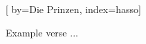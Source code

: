 
[%
    by={Die Prinzen},
    index={hasso}]


    \label{hasso}

    \beginverse
        Example verse ...
    \endverse
\endsong

